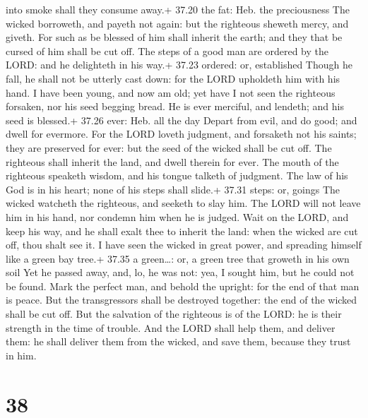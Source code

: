 into smoke shall they consume away.+ 37.20 the fat: Heb. the
preciousness  The wicked borroweth, and payeth not again:
but the righteous sheweth mercy, and giveth.  For such as
be blessed of him shall inherit the earth; and they that be cursed of
him shall be cut off.  The steps of a good man are ordered
by the LORD: and he delighteth in his way.+ 37.23 ordered: or,
established  Though he fall, he shall not be utterly cast
down: for the LORD upholdeth him with his hand.  I have
been young, and now am old; yet have I not seen the righteous forsaken,
nor his seed begging bread.  He is ever merciful, and
lendeth; and his seed is blessed.+ 37.26 ever: Heb. all the day
 Depart from evil, and do good; and dwell for evermore.
 For the LORD loveth judgment, and forsaketh not his
saints; they are preserved for ever: but the seed of the wicked shall be
cut off.  The righteous shall inherit the land, and dwell
therein for ever.  The mouth of the righteous speaketh
wisdom, and his tongue talketh of judgment.  The law of his
God is in his heart; none of his steps shall slide.+ 37.31 steps: or,
goings  The wicked watcheth the righteous, and seeketh to
slay him.  The LORD will not leave him in his hand, nor
condemn him when he is judged.  Wait on the LORD, and keep
his way, and he shall exalt thee to inherit the land: when the wicked
are cut off, thou shalt see it.  I have seen the wicked in
great power, and spreading himself like a green bay tree.+ 37.35 a
green\ldots: or, a green tree that groweth in his own soil 
Yet he passed away, and, lo, he was not: yea, I sought him, but he could
not be found.  Mark the perfect man, and behold the
upright: for the end of that man is peace.  But the
transgressors shall be destroyed together: the end of the wicked shall
be cut off.  But the salvation of the righteous is of the
LORD: he is their strength in the time of trouble.  And the
LORD shall help them, and deliver them: he shall deliver them from the
wicked, and save them, because they trust in him.

\hypertarget{section-37}{%
\section{38}\label{section-37}}

